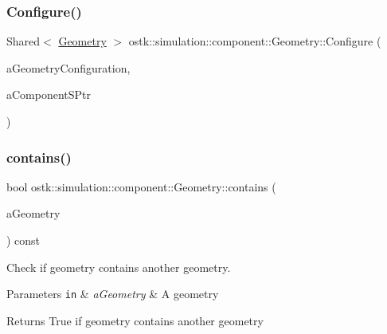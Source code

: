 \subsubsection{\texorpdfstring{Configure()}{Configure()}}
{\footnotesize\ttfamily Shared$<$ \hyperlink{classostk_1_1simulation_1_1component_1_1_geometry}{Geometry} $>$ ostk\+::simulation\+::component\+::\+Geometry\+::\+Configure (\begin{DoxyParamCaption}\item[{const \hyperlink{structostk_1_1simulation_1_1component_1_1_geometry_configuration}{Geometry\+Configuration} \&}]{a\+Geometry\+Configuration,  }\item[{const Shared$<$ const \hyperlink{classostk_1_1simulation_1_1_component}{Component} $>$ \&}]{a\+Component\+S\+Ptr }\end{DoxyParamCaption})\hspace{0.3cm}{\ttfamily [static]}}

\mbox{\label{classostk_1_1simulation_1_1component_1_1_geometry_af39e2376a527720e37e46dc57f3eb6a5}} 
\subsubsection{\texorpdfstring{contains()}{contains()}\hspace{0.1cm}{\footnotesize\ttfamily [1/2]}}
{\footnotesize\ttfamily bool ostk\+::simulation\+::component\+::\+Geometry\+::contains (\begin{DoxyParamCaption}\item[{const \hyperlink{namespaceostk_1_1simulation_1_1component_a911837ab7e6f8471e9927a74795a0077}{Object\+Geometry} \&}]{a\+Geometry }\end{DoxyParamCaption}) const}



Check if geometry contains another geometry. 


\begin{DoxyParams}[1]{Parameters}
\mbox{\tt in}  & {\em a\+Geometry} & A geometry \\
\hline
\end{DoxyParams}
\begin{DoxyReturn}{Returns}
True if geometry contains another geometry 
\end{DoxyReturn}
\mbox{\label{classostk_1_1simulation_1_1component_1_1_geometry_ade44921582930e30c598dbeba365f528}} 
